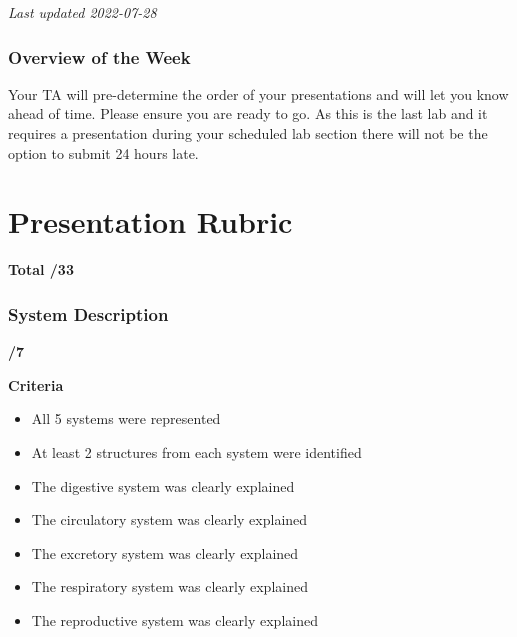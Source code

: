 \documentclass[
]{book}
\providecommand{\tightlist}{%
  \setlength{\itemsep}{0pt}\setlength{\parskip}{0pt}}
\begin{document}
\emph{Last updated 2022-07-28}

\hypertarget{overview-of-the-week-4}{%
\subsection*{Overview of the Week}\label{overview-of-the-week-4}}

Your TA will pre-determine the order of your presentations and will let you know ahead of time. Please ensure you are ready to go. As this is the last lab and it requires a presentation during your scheduled lab section there will not be the option to submit 24 hours late.

\hypertarget{presentation-rubric}{%
\chapter*{Presentation Rubric}\label{presentation-rubric}}

\textbf{Total /33}

\hypertarget{system-description}{%
\subsection*{System Description}\label{system-description}}

\textbf{/7}

\textbf{Criteria}

\begin{itemize}
\tightlist
\item
  All 5 systems were represented
\item
  At least 2 structures from each system were identified
\item
  The digestive system was clearly explained
\item
  The circulatory system was clearly explained
\item
  The excretory system was clearly explained
\item
  The respiratory system was clearly explained
\item
  The reproductive system was clearly explained
\end{itemize}
\end{document}
